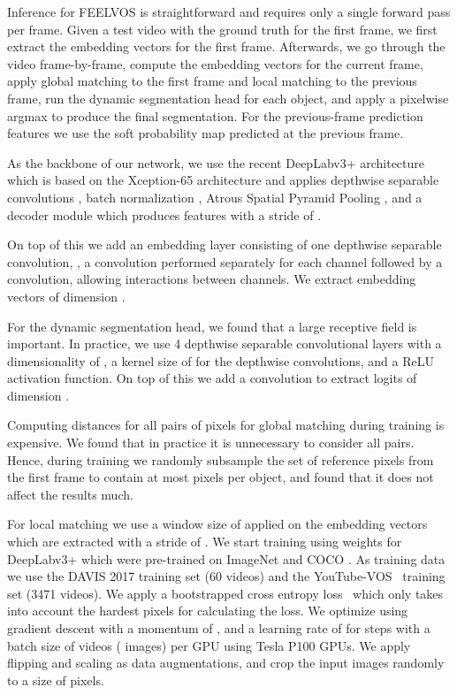 \documentclass[10pt,twocolumn,letterpaper]{article}
\newcommand{\PAR}[1]{\vskip1pt \noindent {\bf #1~}}
\begin{document}
\PAR{Inference.} Inference for FEELVOS is straightforward and requires only a single forward pass per frame. Given a test video with the ground truth for the first frame, we first extract the embedding vectors for the first frame. Afterwards, we go through the video frame-by-frame, compute the embedding vectors for the current frame, apply global matching to the first frame and local matching to the previous frame, run the dynamic segmentation head for each object, and apply a pixelwise argmax to produce the final segmentation. For the previous-frame prediction features we use the soft probability map predicted at the previous frame.

\PAR{Implementation Details.}
As the backbone of our network, we use the recent DeepLabv3+ architecture \cite{Chen18ECCV} which is based on the Xception-65 \cite{CholletCVPR17,dai2017coco} architecture and applies depthwise separable convolutions \cite{howard2017mobilenets}, batch normalization \cite{ioffe2015batch}, Atrous Spatial Pyramid Pooling \cite{chen2017deeplab, chen2017rethinking}, and a decoder module which produces features with a stride of . 

On top of this we add an embedding layer consisting of one depthwise separable convolution, \ie, a  convolution performed separately for each channel followed by a  convolution, allowing interactions between channels. We extract embedding vectors of dimension .

For the dynamic segmentation head, we found that a large receptive field is important. In practice, we use 4 depthwise separable convolutional layers with a dimensionality of , a kernel size of  for the depthwise convolutions, and a ReLU activation function. On top of this we add a  convolution to extract logits of dimension .

Computing distances for all pairs of pixels for global matching during training is expensive. We found that in practice it is unnecessary to consider all pairs. Hence, during training we randomly subsample the set of reference pixels from the first frame to contain at most  pixels per object, and found that it does not affect the results much.

For local matching we use a window size of  applied on the embedding vectors which are extracted with a stride of . We start training using weights for DeepLabv3+ which were pre-trained on ImageNet \cite{imagenet} and COCO \cite{coco}. As training data we use the DAVIS 2017 \cite{DAVIS2017} training set (60 videos) and the YouTube-VOS~\cite{Xu18ECCV} training set (3471 videos). We apply a bootstrapped cross entropy loss~\cite{bootstrappedCE,pohlen2016full} which only takes into account the  hardest pixels for calculating the loss. We optimize using gradient descent with a momentum of , and a learning rate of  for  steps with a batch size of  videos ( images) per GPU using  Tesla P100 GPUs. We apply  flipping and scaling as data augmentations, and crop the input images randomly to a size of  pixels.
\end{document}
